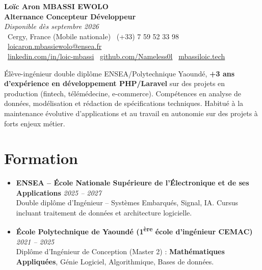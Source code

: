 \documentclass[a4paper,11pt]{article}
\begin{document}
\begin{center}
    {\Large \textbf{Loïc Aron MBASSI EWOLO}} \\ \vspace{4pt}
    \textbf{\large Alternance Concepteur Développeur} \\
    \textit{\small Disponible dès septembre 2026} \\ \vspace{4pt}
    \small
    \faMapMarker\ Cergy, France (Mobile nationale) \quad
    \faPhone\ (+33) 7 59 52 33 98 \quad
    \faEnvelope\ \href{mailto:loicaron.mbassiewolo@ensea.fr}{loicaron.mbassiewolo@ensea.fr} \\ \vspace{2pt}
    \faLinkedin\ \href{https://www.linkedin.com/in/loic-mbassi/}{linkedin.com/in/loic-mbassi} \quad
    \faGithub\ \href{https://github.com/Nameless0l}{github.com/Nameless0l} \quad
    \faGlobe\ \href{https://mbassiloic.tech}{mbassiloic.tech}
\end{center}

\vspace{-6pt}

\noindent\small{Élève-ingénieur double diplôme ENSEA/Polytechnique Yaoundé, \textbf{+3 ans d'expérience en développement PHP/Laravel} sur des projets en production (fintech, télémédecine, e-commerce). Compétences en analyse de données, modélisation et rédaction de spécifications techniques. Habitué à la maintenance évolutive d'applications et au travail en autonomie sur des projets à forts enjeux métier.}

\section{Formation}
\begin{itemize}[leftmargin=*, label=\tiny$\bullet$, nosep]
    \item \textbf{ENSEA -- École Nationale Supérieure de l'Électronique et de ses Applications} \hfill \textit{2025 -- 2027} \\
    \small{Double diplôme d'Ingénieur -- Systèmes Embarqués, Signal, IA. Cursus incluant traitement de données et architecture logicielle.}
    \item \textbf{École Polytechnique de Yaoundé (1\textsuperscript{ère} école d'ingénieur CEMAC)} \hfill \textit{2021 -- 2025} \\
    \small{Diplôme d'Ingénieur de Conception (Master 2) : \textbf{Mathématiques Appliquées}, Génie Logiciel, Algorithmique, Bases de données.}
\end{itemize}
\end{document}
